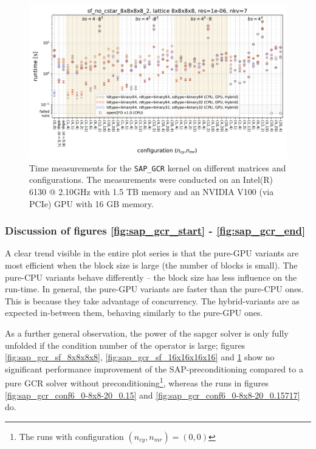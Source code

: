 \documentclass{article}
\theoremstyle{plain} %
\theoremstyle{convention} %
\theoremstyle{remark} %
\def\code#1{\texttt{#1}}
\numberwithin{equation}{section}
\begin{document}
\begin{figure}[h]
    \centering
    \includegraphics[width=1.0\textwidth]{plots/sap_gcr_sf_no_cstar_8x8x8x8_2_lattice_8x8x8x8_res=1e-06_nkv=7}
    \caption{Time measurements for the \code{SAP\_GCR} kernel on different matrices and configurations. The measurements were conducted on an Intel(R) 6130 @ 2.10GHz with 1.5 TB memory and an NVIDIA V100 (via PCIe) GPU with 16 GB memory.}
    \label{fig:sap_gcr4}
    \label{fig:sap_gcr_end}
    \label{fig:sap_gcr_sf_8x8x8x8_2}
\end{figure}

\subsubsection{Discussion of figures \ref{fig:sap_gcr_start} - \ref{fig:sap_gcr_end}}

A clear trend visible in the entire plot series is that the pure-GPU variants are most efficient when the block size is large (the number of blocks is small). The pure-CPU variants behave differently -- the block size has less influence on the run-time. In general, the pure-GPU variants are faster than the pure-CPU ones. This is because they take advantage of concurrency. The hybrid-variants are as expected in-between them, behaving similarly to the pure-GPU ones.

As a further general observation, the power of the \acrshort{sapgcr} solver is only fully unfolded if the condition number of the operator is large; figures \ref{fig:sap_gcr_sf_8x8x8x8}, \ref{fig:sap_gcr_sf_16x16x16x16} and \ref{fig:sap_gcr_sf_8x8x8x8_2} show no significant performance improvement of the SAP-preconditioning compared to a pure GCR solver without preconditioning\footnote{The runs with configuration $(n_{cy}, n_{mr}) = (0,0)$}, whereas the runs in figures \ref{fig:sap_gcr_conf6_0-8x8-20_0.15} and \ref{fig:sap_gcr_conf6_0-8x8-20_0.15717} do.
\end{document}
